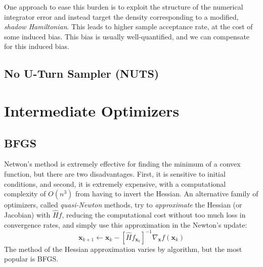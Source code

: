 \documentclass{article}
\theoremstyle{remark}
\theoremstyle{definition}
\begin{document}
One approach to ease this burden is to exploit the structure of the numerical integrator error and instead target the density corresponding to a modified, \textit{shadow Hamiltonian}. This leads to higher sample acceptance rate, at the cost of some induced bias. This bias is usually well-quantified, and we can compensate for this induced bias. 



\subsection{No U-Turn Sampler (NUTS)}



\pagebreak 

\section{Intermediate Optimizers}

\subsection{BFGS}

Netwon's method is extremely effective for finding the minimum of a convex function, but there are two disadvantages. First, it is sensitive to initial conditions, and second, it is extremely expensive, with a computational complexity of $O(n^3)$ from having to invert the Hessian. An alternative family of optimizers, called \textit{quasi-Newton} methods, try to \textit{approximate} the Hessian (or Jacobian) with $\hat{H} f$, reducing the computational cost without too much loss in convergence rates, and simply use this approximation in the Newton's update: 
\[\mathbf{x}_{k+1} \gets \mathbf{x}_k - [\hat{H} f_{\mathbf{x}_k}]^{-1} \nabla_\mathbf{x} f (\mathbf{x}_k)\]
The method of the Hessian approximation varies by algorithm, but the most popular is BFGS. 
\end{document}
